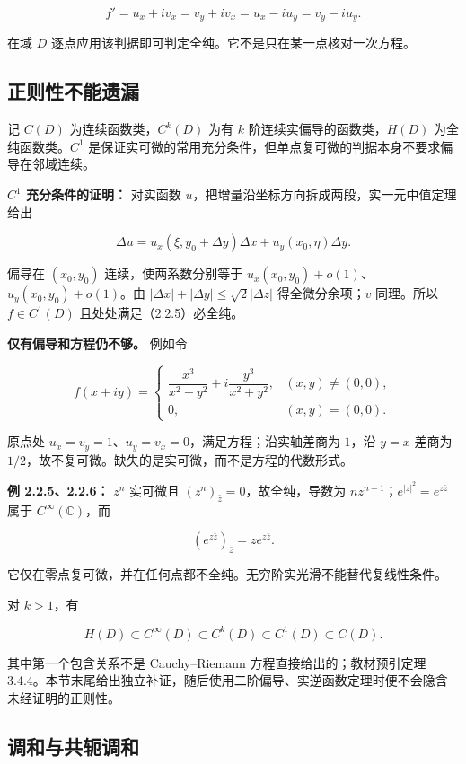 \documentclass[11pt,a4paper]{article}
\begin{document}
\[
f'=u_x+iv_x=v_y+iv_x=u_x-iu_y=v_y-iu_y.
\]

在域 \(D\) 逐点应用该判据即可判定全纯。它不是只在某一点核对一次方程。

\subsection{正则性不能遗漏}\label{ch02-s2-ux6b63ux5219ux6027ux4e0dux80fdux9057ux6f0f}

记 \(C(D)\) 为连续函数类，\(C^k(D)\) 为有 \(k\)
阶连续实偏导的函数类，\(H(D)\) 为全纯函数类。\(C^1\)
是保证实可微的常用充分条件，但单点复可微的判据本身不要求偏导在邻域连续。

\textbf{\(C^1\) 充分条件的证明：} 对实函数
\(u\)，把增量沿坐标方向拆成两段，实一元中值定理给出

\[
\Delta u=u_x(\xi,y_0+\Delta y)\Delta x+u_y(x_0,\eta)\Delta y.
\]

偏导在 \((x_0,y_0)\) 连续，使两系数分别等于
\(u_x(x_0,y_0)+o(1)\)、\(u_y(x_0,y_0)+o(1)\)。由
\(|\Delta x|+|\Delta y|\le\sqrt2|\Delta z|\) 得全微分余项；\(v\)
同理。所以 \(f\in C^1(D)\) 且处处满足（2.2.5）必全纯。

\textbf{仅有偏导和方程仍不够。} 例如令

\[
f(x+iy)=\begin{cases}\dfrac{x^3}{x^2+y^2}+i\dfrac{y^3}{x^2+y^2},&(x,y)\ne(0,0),\\0,&(x,y)=(0,0).\end{cases}
\]

原点处 \(u_x=v_y=1\)、\(u_y=v_x=0\)，满足方程；沿实轴差商为 \(1\)，沿
\(y=x\) 差商为
\(1/2\)，故不复可微。缺失的是实可微，而不是方程的代数形式。

\textbf{例 2.2.5、2.2.6：} \(z^n\) 实可微且
\((z^n)_{\bar z}=0\)，故全纯，导数为
\(nz^{n-1}\)；\(e^{|z|^2}=e^{z\bar z}\) 属于 \(C^\infty(\mathbb C)\)，而

\[
(e^{z\bar z})_{\bar z}=ze^{z\bar z}.
\]

它仅在零点复可微，并在任何点都不全纯。无穷阶实光滑不能替代复线性条件。

对 \(k>1\)，有

\[
H(D)\subset C^\infty(D)\subset C^k(D)\subset C^1(D)\subset C(D).
\]

其中第一个包含关系不是 Cauchy--Riemann 方程直接给出的；教材预引定理
3.4.4。本节末尾给出独立补证，随后使用二阶偏导、实逆函数定理时便不会隐含未经证明的正则性。

\subsection{调和与共轭调和}\label{ch02-s2-ux8c03ux548cux4e0eux5171ux8f6dux8c03ux548c}
\end{document}
